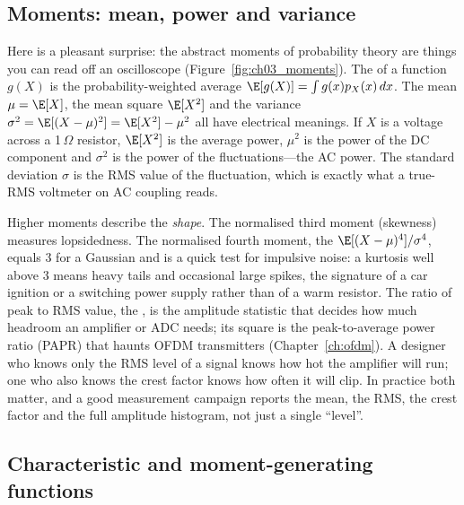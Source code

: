 \subsection{Moments: mean, power and variance}

Here is a pleasant surprise: the abstract moments of probability theory are things you can read
off an oscilloscope (Figure~\ref{fig:ch03_moments}). The  of a function $g(X)$
is the probability-weighted average $\E[g(X)]=\int g(x)p_X(x)\,dx$. The mean $\mu=\E[X]$, the mean
square $\E[X^2]$ and the variance $\sigma^2=\E[(X-\mu)^2]=\E[X^2]-\mu^2$ all have electrical
meanings. If $X$ is a voltage across a 1\,$\Omega$ resistor, $\E[X^2]$ is the average power,
$\mu^2$ is the power of the DC component and $\sigma^2$ is the power of the fluctuations---the AC
power. The standard deviation $\sigma$ is the RMS value of the fluctuation, which is exactly what a
true-RMS voltmeter on AC coupling reads.


Higher moments describe the \emph{shape}. The normalised third moment (skewness) measures
lopsidedness. The normalised fourth moment, the  $\E[(X-\mu)^4]/\sigma^4$, equals
3 for a Gaussian and is a quick test for impulsive noise: a kurtosis well above 3 means heavy tails
and occasional large spikes, the signature of a car ignition or a switching power supply rather
than of a warm resistor. The ratio of peak to RMS value, the , is the amplitude
statistic that decides how much headroom an amplifier or ADC needs; its square is the
peak-to-average power ratio (PAPR) that haunts OFDM transmitters (Chapter~\ref{ch:ofdm}). A
designer who knows only the RMS level of a signal knows how hot the amplifier will run; one who
also knows the crest factor knows how often it will clip. In practice both matter, and a good
measurement campaign reports the mean, the RMS, the crest factor and the full amplitude
histogram, not just a single ``level''.

\subsection{Characteristic and moment-generating functions}

